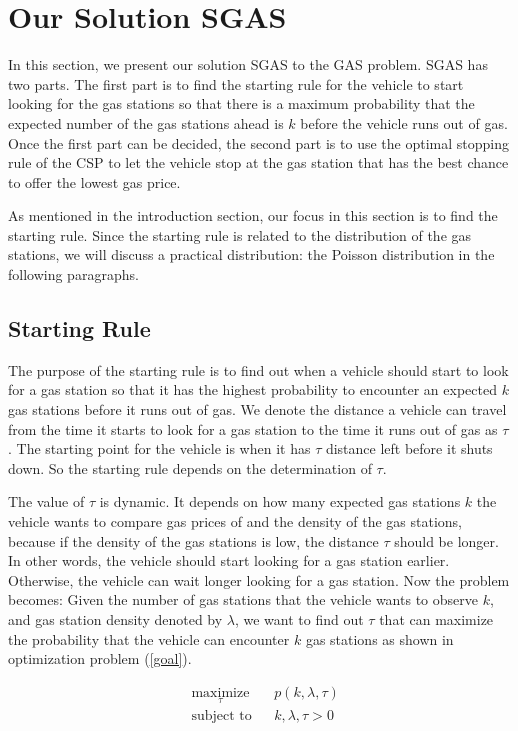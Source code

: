 \documentclass[conference]{IEEEtran}
\theoremstyle{definition}
\begin{document}
\section{Our Solution SGAS}
In this section, we present our solution SGAS to the GAS problem. SGAS has two parts. The first part is to find the starting rule for the vehicle to start looking for the gas stations so that there is a maximum probability that the expected number of the gas stations ahead is $k$ before the vehicle runs out of gas. Once the first part can be decided, the second part is to use the optimal stopping rule of the CSP to let the vehicle stop at the gas station that has the best chance to offer the lowest gas price.

As mentioned in the introduction section, our focus in this section is to find the starting rule. Since the starting rule is related to the distribution of the gas stations, we will discuss a practical distribution: the Poisson distribution in the following paragraphs.

\subsection{Starting Rule}
The purpose of the starting rule is to find out when a vehicle should start to look for a gas station so that it has the highest probability to encounter an expected $k$ gas stations before it runs out of gas. We denote the distance a vehicle can travel from the time it starts to look for a gas station to the time it runs out of gas as $\tau$. The starting point for the vehicle is when it has $\tau$ distance left before it shuts down. So the starting rule depends on the determination of $\tau$.

The value of $\tau$ is dynamic. It depends on how many expected gas stations $k$ the vehicle wants to compare gas prices of and the density of the gas stations, because if the density of the gas stations is low, the distance $\tau$ should be longer. In other words, the vehicle should start looking for a gas station earlier. Otherwise, the vehicle can wait longer looking for a gas station. Now the problem becomes:   Given the number of gas stations that the vehicle wants to observe $k$, and gas station density denoted by $\lambda$, we want to find out $\tau$ that can maximize the probability that the vehicle can encounter $k$ gas stations as shown in optimization problem (\ref{goal}).

\begin{equation} \label{goal}
\begin{aligned}
   & \underset{\tau}{\text{maximize}}
   & &  p(k, \lambda, \tau) \\
   & \text{subject to} & & k, \lambda, \tau >0    \\
\end{aligned}
\end{equation}
\end{document}
